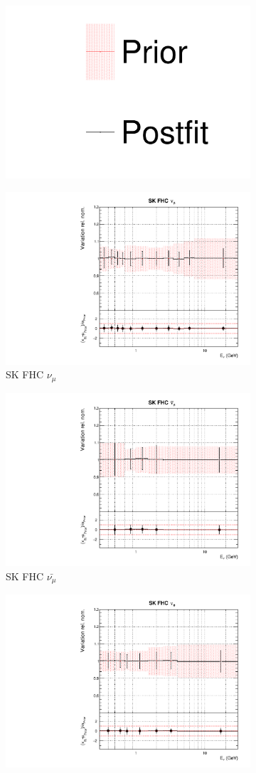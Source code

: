 \begin{figure}
\centering
\begin{subfigure}{0.8\textwidth}
  \centering
  \includegraphics[width=0.24\linewidth]{figs/asmv_leg}
\end{subfigure}
\begin{subfigure}{0.45\textwidth}
  \centering
  \includegraphics[width=0.75\linewidth]{figs/asmvflux8}
  \caption{SK FHC $\nu_{\mu}$}
\end{subfigure}
\begin{subfigure}{0.45\textwidth}
  \centering
  \includegraphics[width=0.75\linewidth]{figs/asmvflux9}
  \caption{SK FHC $\bar{\nu_{\mu}}$}
\end{subfigure}
\begin{subfigure}{0.45\textwidth}
  \centering
  \includegraphics[width=0.75\linewidth]{figs/asmvflux10}

\end{subfigure}
\end{figure}
